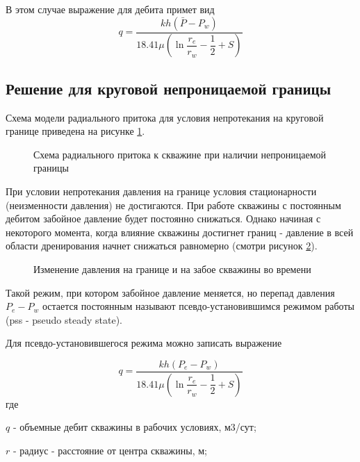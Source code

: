 В этом случае выражение для дебита примет вид
$$q=\frac{kh\left( \bar{P}-P_w\right)}{ 18.41 \mu\left(\ln{\dfrac{r_e}{r_w}}  - \dfrac{1}{2}+ S \right)}$$


\subsection{Решение для круговой непроницаемой границы}

Схема модели радиального притока для условия непротекания на круговой границе приведена на рисунке \ref{ris:radial_inflow_steady_state_2}.

\begin{figure}[h!]
	\begin{center}
		
		\caption{Схема радиального притока к скважине при наличии непроницаемой границы}
		\label{ris:radial_inflow_steady_state_2}
	\end{center}
\end{figure}

При условии непротекания давления на границе условия стационарности (неизменности давления) не достигаются. При работе скважины с постоянным дебитом забойное давление будет постоянно снижаться. Однако начиная с некоторого момента, когда влияние скважины достигнет границ - давление в всей области дренирования начнет снижаться равномерно (смотри рисунок \ref{ris:radial_pss_dynamics}). 

\begin{figure}[h!]
	\begin{center}
		
		\caption{Изменение давления на границе и на забое скважины во времени}
		\label{ris:radial_pss_dynamics}
	\end{center}
\end{figure}

Такой режим, при котором забойное давление меняется, но перепад давления $P_e - P_w$ остается постоянным называют псевдо-установившимся режимом работы (pss - pseudo steady state). 

Для псевдо-установившегося режима можно записать выражение

$$q=\frac{kh\left(P_e-P_w\right)}{ 18.41 \mu\left(\ln{\dfrac{r_e}{r_w}} - \dfrac{1}{2} + S\right)}$$
где 

$q$ - объемные дебит скважины в рабочих условиях, м3/сут;

$r$ -  радиус - расстояние от центра скважины, м;

